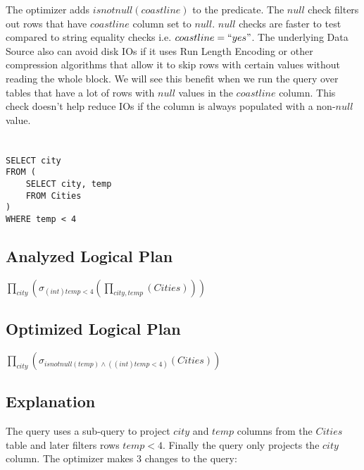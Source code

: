 \documentclass[12pt]{article}
\begin{document}
The optimizer adds $isnotnull(coastline)$ to the predicate. The $ null$ check filters out rows that have $coastline$ column set to $null$. $null$ checks are faster to test compared to string equality checks i.e. $coastline = ``yes"$. The underlying Data Source also can avoid disk IOs if it uses Run Length Encoding or other compression algorithms that allow it to skip rows with certain values without reading the whole block. We will see this benefit when we run the query over tables that have a lot of rows with $null$ values in the $coastline$ column. This check doesn't help reduce IOs if the column is always populated with a non-$null$ value.
\newpage

\section{}
\begin{verbatim}
SELECT city
FROM (
    SELECT city, temp
    FROM Cities
)
WHERE temp < 4
\end{verbatim}

\subsection*{Analyzed Logical Plan}

$\prod_{city}(\sigma_{(int)temp < 4}(\prod_{city, temp}(Cities)))$

\subsection*{Optimized Logical Plan}

$\prod_{city}(\sigma_{isnotnull(temp) \wedge ((int)temp < 4)}(Cities))$

\subsection*{Explanation}

The query uses a sub-query to project $city$ and $temp$ columns from the $Cities$ table and later filters rows $temp < 4$. Finally the query only projects the $city$ column. The optimizer makes 3 changes to the query:
\end{document}

